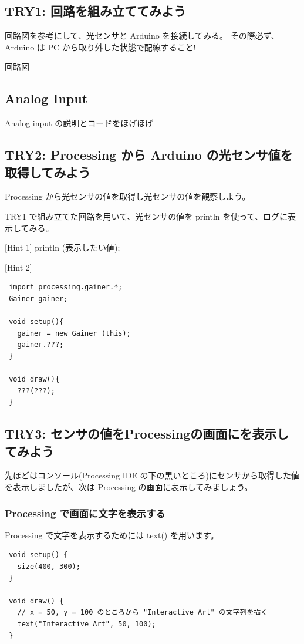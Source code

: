 \documentclass[11pt,a4paper]{jarticle}
\begin{document}
\subsection*{TRY1: 回路を組み立ててみよう}
回路図を参考にして、光センサと Arduino を接続してみる。
その際必ず、Arduino は PC から取り外した状態で配線すること!

回路図

\subsection*{Analog Input}
Analog input の説明とコードをほげほげ


\subsection*{TRY2: Processing から Arduino の光センサ値を取得してみよう}
Processing から光センサの値を取得し光センサの値を観察しよう。

TRY1 で組み立てた回路を用いて、光センサの値を println を使って、ログに表示してみる。

[Hint 1]
println (表示したい値);

[Hint 2]

\begin{lstlisting}
 import processing.gainer.*;
 Gainer gainer;

 void setup(){
   gainer = new Gainer (this);
   gainer.???;
 }

 void draw(){
   ???(???);
 }
\end{lstlisting}


\subsection*{TRY3: センサの値をProcessingの画面にを表示してみよう}
先ほどはコンソール(Processing IDE の下の黒いところ)にセンサから取得した値を表示しましたが、次は Processing の画面に表示してみましょう。

\subsubsection*{Processing で画面に文字を表示する}
Processing で文字を表示するためには text() を用います。
\begin{lstlisting}
 void setup() {
   size(400, 300);
 }

 void draw() {
   // x = 50, y = 100 のところから "Interactive Art" の文字列を描く
   text("Interactive Art", 50, 100);
 }
\end{lstlisting}
\end{document}

